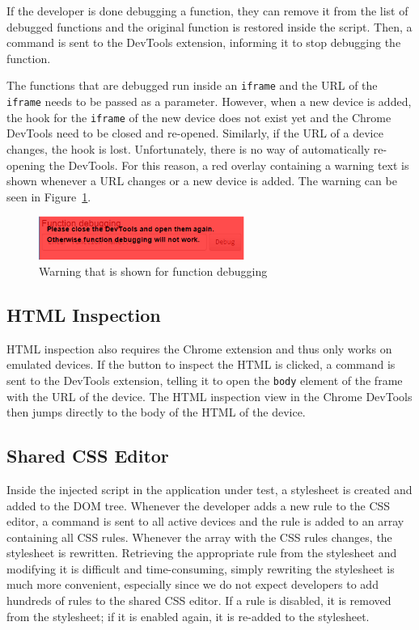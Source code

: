 If the developer is done debugging a function, they can remove it from the list of debugged functions and the original function is restored inside the script. Then, a command is sent to the DevTools extension, informing it to stop debugging the function. 

The functions that are debugged run inside an \lstinline|iframe| and the URL of the \lstinline|iframe| needs to be passed as a parameter. However, when a new device is added, the hook for the \lstinline|iframe| of the new device does not exist yet and the Chrome DevTools need to be closed and re-opened. Similarly, if the URL of a device changes, the hook is lost. Unfortunately, there is no way of automatically re-opening the DevTools. For this reason, a red overlay containing a warning text is shown whenever a URL changes or a new device is added. The warning can be seen in Figure~\ref{fig:warning}.

\begin{figure}[H]
  \centering
    \includegraphics[width=0.6\textwidth]{images/screenshots/warning.png}
	\caption[Screenshot: Function debugging warning]{Warning that is shown for function debugging}
	\label{fig:warning}
\end{figure}

\subsection{HTML Inspection}

HTML inspection also requires the Chrome extension and thus only works on emulated devices. If the button to inspect the HTML is clicked, a command is sent to the DevTools extension, telling it to open the \lstinline|body| element of the frame with the URL of the device. The HTML inspection view in the Chrome DevTools then jumps directly to the body of the HTML of the device.

\subsection{Shared CSS Editor}

Inside the injected script in the application under test, a stylesheet is created and added to the DOM tree. Whenever the developer adds a new rule to the CSS editor, a command is sent to all active devices and the rule is added to an array containing all CSS rules. Whenever the array with the CSS rules changes, the stylesheet is rewritten. Retrieving the appropriate rule from the stylesheet and modifying it is difficult and time-consuming, simply rewriting the stylesheet is much more convenient, especially since we do not expect developers to add hundreds of rules to the shared CSS editor. If a rule is disabled, it is removed from the stylesheet; if it is enabled again, it is re-added to the stylesheet.

